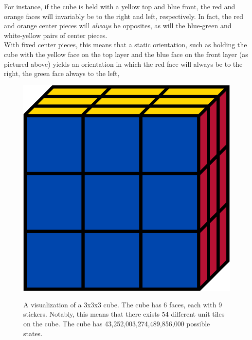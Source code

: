 \documentclass[12pt]{article}
\begin{document}
For instance, if the cube is held with a yellow top and blue front, the red and orange faces will invariably be to the right and left, respectively. In fact, the red and orange center pieces will \textit{always} be opposites, as will the blue-green and white-yellow pairs of center pieces.\\

With fixed center pieces, this means that a static orientation, such as holding the cube with the yellow face on the top layer and the blue face on the front layer (as pictured above) yields an orientation in which the red face will always be to the right, the green face always to the left,

\begin{figure}[H]
    \hspace{20pt}
    \begin{minipage}{.3\textwidth}
        \includegraphics[scale=0.1]{cube.png}
    \end{minipage}%
    \begin{minipage}{.6\textwidth}
        A visualization of a 3x3x3 cube. The cube has 6 faces, each with 9 stickers. Notably, this means that there exists 54 different unit tiles on the cube. The cube has 43,252,003,274,489,856,000 possible states.
    \end{minipage}
    

\end{figure}
\end{document}
